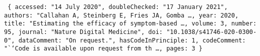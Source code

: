 \noindent\texttt{
\hspace*{\codeIndent}\{\hspace*{\codeIndent}\newline
\hspace*{2\codeIndent} accessed: "14 July 2020",\newline
\hspace*{2\codeIndent} doubleChecked: "17 January 2021",\newline
\hspace*{2\codeIndent} authors: "Callahan A, Steinberg E, Fries JA, Gomba \ldots,\newline
\hspace*{2\codeIndent} year: 2020,\newline
\hspace*{2\codeIndent} title: "Estimating the efficacy of symptom-based \ldots,\newline
\hspace*{2\codeIndent} volume: 3,\newline
\hspace*{2\codeIndent} number: 95,\newline
\hspace*{2\codeIndent} journal: "Nature Digital Medicine",\newline
\hspace*{2\codeIndent} doi: "10.1038/s41746-020-0300-0",\newline
\hspace*{2\codeIndent} dataComment: "On request.",\newline
\hspace*{2\codeIndent} hasCodeInPrinciple: 1,\newline
\hspace*{2\codeIndent} codeComment: "``Code is available upon request from th \ldots,\newline
\hspace*{2\codeIndent} pages: 3\newline
\hspace*{\codeIndent}\}
}
